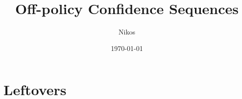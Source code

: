 \documentclass{article}
\title{Off-policy Confidence Sequences}
\author{Nikos}
\date{\today}
\begin{document}
\maketitle

\section{Leftovers}

\end{document}
